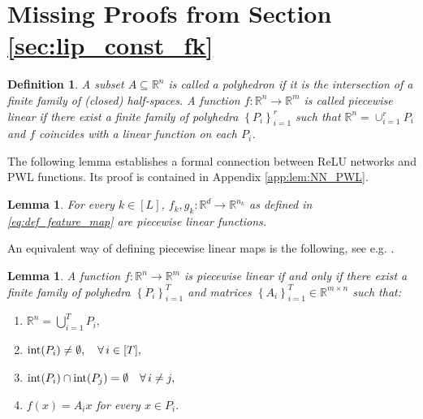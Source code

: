 \documentclass[11pt]{article}
\def\RR{\mathbb{R}}
\def\Set#1{\left\{ #1 \right\}}
\newtheorem{lemma}[theorem]{Lemma}
\newtheorem{definition}[theorem]{Definition}
\def\interior{\mathop{\rm int}\nolimits}
\begin{document}
\section{Missing Proofs from Section \ref{sec:lip_const_fk}}
\begin{definition}\label{def:PWL}
    A subset $A\subseteq\RR^n$ is called a polyhedron if it is the intersection of a finite family of (closed) half-spaces.
    A function $f:\RR^n\to\RR^m$ is called piecewise linear 
    if there exist a finite family of polyhedra $\Set{P_i}_{i=1}^{r}$ such that
    $\RR^n=\cup_{i=1}^{r} P_i$ and $f$ coincides with a linear function on each $P_i$.
\end{definition}
The following lemma establishes a formal connection between ReLU networks and PWL functions. Its proof is contained in Appendix \ref{app:lem:NN_PWL}.
\begin{lemma}\label{lem:NN_PWL}
    For every $k\in[L]$, $f_k,g_k:\RR^d\to\RR^{n_k}$ as defined in \eqref{eq:def_feature_map} are piecewise linear functions.
\end{lemma}
An equivalent way of defining piecewise linear maps is the following, see e.g. \citep{Gorokhovik2011}.
\begin{lemma}\label{lem:PWL_polyhedra}
    A function $f:\RR^n\to\RR^m$ is piecewise linear 
    if and only if there exist a finite family of polyhedra $\Set{P_i}_{i=1}^{T}$ 
    and matrices $\Set{A_i}_{i=1}^{T}\in\RR^{m\times n}$ such that:
    \begin{enumerate}
	\item $\RR^n=\bigcup_{i=1}^{T} P_i,$
	\item $\interior(P_i)\neq\emptyset,\quad\forall\,i\in[T],$
	\item $\interior(P_i)\cap \interior(P_j)=\emptyset\quad\forall\,i\neq j,$
	\item $f(x)=A_ix$ for every $x\in P_i.$
    \end{enumerate}
\end{lemma}
\end{document}
